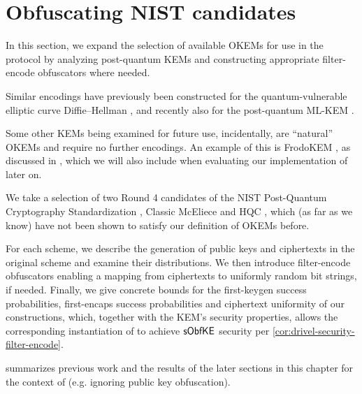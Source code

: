 \chapter{Obfuscating NIST candidates}\label{ch:obfuscation}

In this section, we expand the selection of available OKEMs for use in the \drivel{} protocol by analyzing post-quantum KEMs and constructing appropriate filter-encode obfuscators where needed.

Similar encodings have previously been constructed for the quantum-vulnerable elliptic curve Diffie–Hellman \cite{EC:vAhHop04,tor-dev-udh,USENIX:WWGH11,CCS:BHKL13,FC:Tibouchi14}, and recently also for the post-quantum ML-KEM \cite{fips203,CCS:GunSteVei24}.

Some other KEMs being examined for future use, incidentally, are ``natural'' OKEMs and require no further encodings. An example of this is FrodoKEM \cite{NISTPQC-R3:FrodoKEM20}, as discussed in \cite[Section~2.1]{EPRINT:GRSV25}, which we will also include when evaluating our implementation of \drivel{} later on.

We take a selection of two Round 4 candidates of the NIST Post-Quantum Cryptography Standardization \cite{nist-standardization}, Classic McEliece \cite{NISTPQC-R4:ClassicMcEliece22} and HQC \cite{NISTPQC-R4:HQC22}, which (as far as we know) have not been shown to satisfy our definition of OKEMs before.

For each scheme, we describe the generation of public keys and ciphertexts in the original scheme and examine their distributions. We then introduce filter-encode obfuscators enabling a mapping from ciphertexts to uniformly random bit strings, if needed.
Finally, we give concrete bounds for the first-keygen success probabilities, first-encaps success probabilities and ciphertext uniformity of our constructions, which, together with the KEM's security properties, allows the corresponding instantiation of \drivel{} to achieve $\mathsf{sObfKE}$ security per \cref{cor:drivel-security-filter-encode}.

 summarizes previous work and the results of the later sections in this chapter for the context of \drivel{} (e.g. ignoring public key obfuscation).

